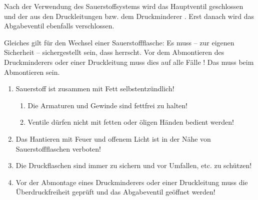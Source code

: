 \documentclass[
ngerman,
paper=a4,
asymmetric,
fontsize=8pt,
draft=false,
numbers=noenddot,
bibtotocnumbered,
footnotes=multiple,
toc=flat,
]{scrbook}
\begin{document}
{Nach der Verwendung des Sauerstoffsystems wird das
Hauptventil geschlossen und der  aus den
Druckleitungen bzw. dem Druckminderer . Erst
danach wird das Abgabeventil ebenfalls verschlossen.

Gleiches gilt für den Wechsel einer Sauerstoffflasche: Es
muss -- zur eigenen Sicherheit -- sichergestellt sein, dass
 herrscht. Vor
dem Abmontieren des Druckminderers oder einer Druckleitung
muss dies auf alle Fälle ! Das  muss beim Abmontieren
 sein.



}{
}{}{}{}


\bigskip

\begin{tcolorbox}[
title={\flushleft Sicherheitshinweise},
fonttitle=\sffamily\bfseries\small,fontupper=\FontSansNarrowFamily\small,
left=2pt,right=2pt,
boxrule=0.5pt,
colframe=DefaultRed,
colback=DefaultRed!5,
]
\color{DefaultRed}
\begin{center}
\end{center}

\begin{enumerate}
    \item Sauerstoff ist zusammen mit Fett selbstentzündlich!
    \begin{enumerate}
        \item Die Armaturen und Gewinde sind fettfrei zu
        halten!
        \item Ventile dürfen nicht mit fetten oder öligen
        Händen bedient werden!
    \end{enumerate}
    \item Das Hantieren mit Feuer und offenem
    Licht ist in der Nähe von Sauerstoffflaschen verboten!
    \item Die Druckflaschen sind immer zu sichern und vor
    Umfallen, etc. zu schützen!
    \item Vor der Abmontage eines
Druckminderers oder einer Druckleitung muss die
Überdruckfreiheit geprüft und das Abgabeventil geöffnet
werden!
\end{enumerate}

\begin{center}
\end{center}



\end{tcolorbox}
\end{document}
